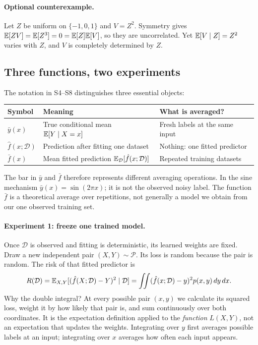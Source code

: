 \paragraph{Optional counterexample.} Let $Z$ be uniform on $\{-1,0,1\}$ and $V=Z^2$. Symmetry gives $\mathbb{E}[ZV]=\mathbb{E}[Z^3]=0=\mathbb{E}[Z]\mathbb{E}[V]$, so they are uncorrelated. Yet $\mathbb{E}[V\mid Z]=Z^2$ varies with $Z$, and $V$ is completely determined by $Z$.

\subsection{Three functions, two experiments}
\label{sec:reg:random}
The notation in S4--S8 distinguishes three essential objects:
\begin{center}\small
\begin{tabular}{p{.19\linewidth}p{.39\linewidth}p{.31\linewidth}}
\toprule Symbol & Meaning & What is averaged?\\\midrule
$\bar y(x)$ & True conditional mean $\mathbb{E}[Y\mid X=x]$ & Fresh labels at the same input\\
$\hat f(x;\mathcal D)$ & Prediction after fitting one dataset & Nothing: one fitted predictor\\
$\bar f(x)$ & Mean fitted prediction $\mathbb{E}_{\mathcal D}[\hat f(x;\mathcal D)]$ & Repeated training datasets\\\bottomrule
\end{tabular}
\end{center}
The bar in $\bar y$ and $\bar f$ therefore represents different averaging operations. In the sine mechanism $\bar y(x)=\sin(2\pi x)$; it is not the observed noisy label. The function $\bar f$ is a theoretical average over repetitions, not generally a model we obtain from our one observed training set.

\paragraph{Experiment 1: freeze one trained model.} Once $\mathcal D$ is observed and fitting is deterministic, its learned weights are fixed. Draw a new independent pair $(X,Y)\sim\mathcal P$. Its loss is random because the pair is random. The risk of that fitted predictor is
\begin{equation}
R(\mathcal D)=\mathbb{E}_{X,Y}[(\hat f(X;\mathcal D)-Y)^2\mid\mathcal D]
=\iint(\hat f(x;\mathcal D)-y)^2p(x,y)\,dy\,dx.
\label{eq:reg:risk}
\end{equation}
Why the double integral? At every possible pair $(x,y)$ we calculate its squared loss, weight it by how likely that pair is, and sum continuously over both coordinates. It is the expectation definition applied to the \emph{function} $L(X,Y)$, not an expectation that updates the weights. Integrating over $y$ first averages possible labels at an input; integrating over $x$ averages how often each input appears.

